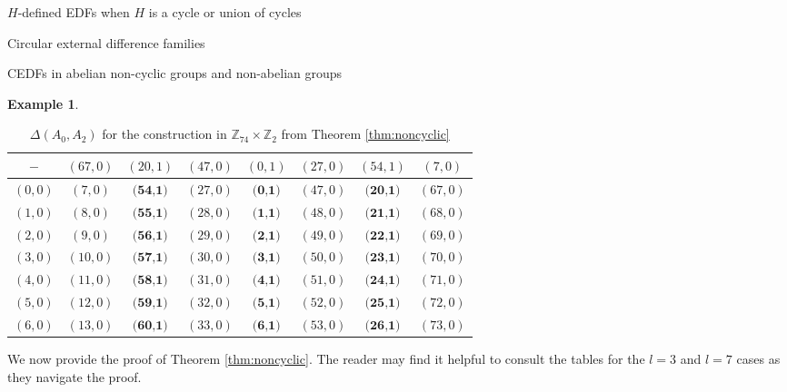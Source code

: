 \documentclass[12pt, a4paper]{article}
\theoremstyle{definition}
\newtheorem{example}[theorem]{Example}
\begin{document}
\begin{section}{$H$-defined EDFs when $H$ is a cycle or union of cycles}
\begin{subsection}{Circular external difference families}
\begin{subsection}{CEDFs in abelian non-cyclic groups and non-abelian groups}
\begin{example}
\begin{table}[h]
\caption{$\Delta(A_2,A_1)$ for the construction in $\mathbb{Z}_{74} \times \mathbb{Z}_2$ from Theorem \ref{thm:noncyclic}}
\label{table:A_2A_1}
\end{table}
\begin{table}[h]
\renewcommand{\arraystretch}{1.2}
\centering
\setlength\tabcolsep{3pt}
\begin{tabular}{|c|ccccccc|} 
\hline
$-$ & $(67,0)$&$ (20,1)$&$(47,0) $&$(0,1)$&$ (27,0)$&$ (54,1)	$&$(7,0)$ \\ \hline
$(0,0)$ & $ (7,0)	$&$\textbf{(54,1)}	$&$(27,0)	$&$\textbf{(0,1)}	$&$(47,0)	$&$\textbf{(20,1)} $&$	(67,0)$ \\
$(1,0)$ & $ (8,0)	$&$\textbf{(55,1)}	$&$(28,0)	$&$\textbf{(1,1)}	$&$(48,0)	$&$\textbf{(21,1)}	$&$(68,0)$ \\
$(2,0)$ & $ (9,0)	$&$\textbf{(56,1)}	$&$(29,0)	$&$\textbf{(2,1)}	$&$(49,0)	$&$\textbf{(22,1)}$&$	(69,0)$ \\
$(3,0)$ & $ (10,0)	$&$\textbf{(57,1)}	$&$(30,0)	$&$\textbf{(3,1)}	$&$(50,0)	$&$\textbf{(23,1)}$&$	(70,0)$ \\
$(4,0)$ & $ (11,0)	$&$\textbf{(58,1)}	$&$(31,0)$&$	\textbf{(4,1)}	$&$(51,0)	$&$\textbf{(24,1)}	$&$(71,0)$ \\
$(5,0)$ & $ (12,0)	$&$\textbf{(59,1)}	$&$(32,0)	$&$\textbf{(5,1)}	$&$(52,0)	$&$\textbf{(25,1)}$&$	(72,0)$ \\
$(6,0)$ & $ (13,0)	$&$\textbf{(60,1)}	$&$(33,0) $&$	\textbf{(6,1)}	$&$(53,0)	$&$\textbf{(26,1)}	$&$(73,0)$ \\
\hline
\end{tabular}
	
\caption{$\Delta(A_0,A_2)$ for the construction in $\mathbb{Z}_{74} \times \mathbb{Z}_2$ from Theorem \ref{thm:noncyclic}}
\label{table:A_0A_2}
\end{table}
\end{example}


We now provide the proof of Theorem \ref{thm:noncyclic}.  The reader may find it helpful to consult the tables for the $l=3$ and $l=7$ cases as they navigate the proof.


\end{subsection}
\end{subsection}
\end{section}
\end{document}
